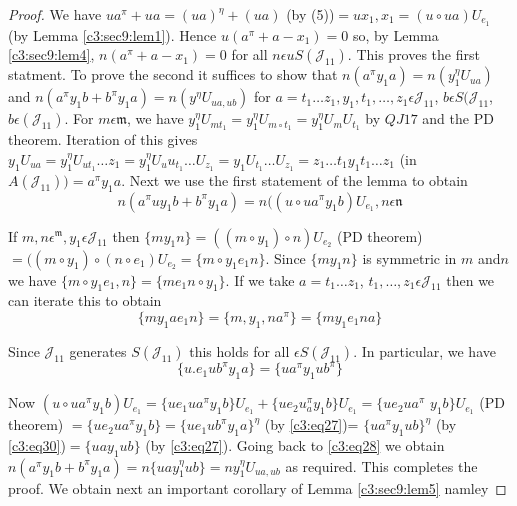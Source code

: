 \begin{proof}
We have $ua^{\pi}+ua=(ua)^{\eta}+(ua)$ (by (5))$=ux_1,x_1=(u\circ
ua)U_{e_1}$ (by Lemma \ref{c3:sec9:lem1}). Hence $u(a^{\pi}+a-x_1)=0$
so, by Lemma \ref{c3:sec9:lem4}, $n(a^{\pi}+a-x_1)=0$ for all $n\epsilon
uS(\mathscr{J}_{11})$. This proves the first statment. To prove the
second it suffices to show that $n(a^{\pi}y_1a)=n(y_1^{\eta}U_{ua})$
and $n(a^{\pi}y_1b+b^{\pi}y_1a)=n(y^{\eta}U_{ua,ub})$ for $a=t_1\ldots
z_1,y_1,t_1,\ldots, z_1\epsilon \mathscr{J}_{11}$, $b\epsilon
S(\mathscr{J}_{11}$, $b\epsilon (\mathscr{J}_{11})$. For $m\epsilon
\mathfrak{m}$, we have $y^{\eta}_1 U_{mt_1}=y^{\eta}_1U_{m\circ
  t_1}=y^{\eta}_1U_mU_{t_1}$ by $QJ 17$ and the  PD theorem. Iteration
of this gives $y_1U_{ua}=y^{\eta}_1U_{ut_1}\ldots
z_1=y^{\eta}_1U_uu_{t_1}\ldots U_{z_1}=y_1U_{t_1}\ldots
U_{z_1}=z_1\ldots t_1y_1t_1\ldots z_1$ (in
$A(\mathscr{J}_{11}))=a^{\pi}y_1a$. Next we use the first statement of
the lemma to obtain
\begin{equation*}
n(a^{\pi}uy_1b+b^{\pi}y_1a)=n((u\circ u a^{\pi}y_1b)U_{e_1},n\epsilon
\mathfrak{n}\tag{28} \label{c3:eq28} 
\end{equation*}

If $m,n\epsilon^{\mathfrak{m}}, y_1\epsilon \mathscr{J}_{11}$ then
$\{my_1n\}=((m\circ y_1)\circ n)U_{e_2}$ (PD theorem)$= ((m\circ
y_1)\circ (n\circ e_1)U_{e_2}=\{m\circ y_1e_1n\}$. Since $\{my_1 n\}$
is symmetric in $m$ and\pageoriginale $n$ we have $\{m\circ
y_1e_1,n\}=\{me_1n\circ y_1\}$. If we take $a=t_1\ldots z_1$,
$t_1,\ldots,z_1\epsilon \mathscr{J}_{11}$ then we can iterate this to
obtain
\begin{equation*}
\{my_1 ae_1 n\}=\{m, y_1,na^{\pi}\}=\{my_1e_1na\}\tag{29}\label{c3:eq29}
\end{equation*}

Since $\mathscr{J}_{11}$ generates $S(\mathscr{J}_{11})$ this holds
for all $\epsilon S(\mathscr{J}_{11})$. In particular, we have
\begin{equation*}
  \{u.e_1ub^{\pi}y_1a\}=\{ua^{\pi}y_1ub^{\pi}\}\tag{30}\label{c3:eq30} 
\end{equation*}

Now $(u\circ u a^{\pi}y_1 b)U_{e_1}=\{u e_1ua^{\pi}y_1b\}U_{e_1}+\{u
e_2 u^{\pi}_ay_1b\}U_{e_1}=\{u e_2ua^{\pi}$ $y_1b\}U_{e_1}$ (PD theorem)
$=\{u e_2ua^{\pi}y_1b\}=\{u e_1 ub^{\pi}y_1a\}^{\eta}$ (by
\eqref{c3:eq27})= \break $\{ua^{\pi}y_1ub\}^{\eta}$ (by
\eqref{c3:eq30})$=\{uay_1 ub\}$ (by 
\eqref{c3:eq27}). Going back to \eqref{c3:eq28} we obtain
$n(a^{\pi}y_1b+b^{\pi}y_1a)=n\{ua 
y^{\eta}_1ub\}=ny^{\eta}_1 U_{ua,ub}$ as required. This completes the
proof.
We obtain next an important corollary of Lemma \ref{c3:sec9:lem5} namley
\end{proof}

